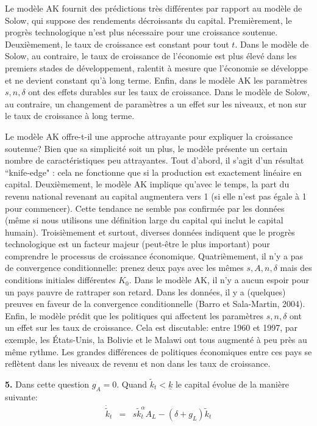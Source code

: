 \documentclass[11pt,a4paper]{article}
\begin{document}
Le modèle AK fournit des prédictions très différentes par rapport au modèle de  Solow, qui suppose des rendements décroissants du capital. Premièrement, le progrès technologique n'est plus nécessaire pour une croissance soutenue. Deuxièmement, le taux de croissance est constant pour tout $t$. Dans le modèle de Solow, au contraire, le taux de croissance de l'économie est plus élevé dans les premiers stades de développement, ralentit à mesure que l'économie se développe et ne devient constant qu'à long terme. Enfin, dans le modèle AK les 
paramètres $s,n,\delta$ ont des effets  durables sur les taux de croissance. Dans le modèle de Solow, au contraire, un changement de paramètres a un effet sur les niveaux, et non sur le taux de croissance à long terme.

Le modèle AK offre-t-il une approche attrayante pour expliquer la croissance soutenue? Bien que sa simplicité soit un plus, le modèle présente un certain nombre de caractéristiques peu attrayantes. Tout d'abord, il s'agit d'un résultat ``knife-edge" : cela ne fonctionne que si la production est exactement linéaire en capital. Deuxièmement, le modèle AK implique qu'avec le temps, la part du revenu national revenant au capital augmentera vers 1 (si elle n'est pas égale à 1 pour commencer). Cette tendance ne semble pas confirmée par les données (même si nous utilisons une définition large du capital qui inclut le capital humain). Troisièmement et surtout, diverses données indiquent que le progrès technologique est un facteur majeur (peut-être le plus important) pour comprendre le processus de croissance économique. Quatrièmement, il n'y a pas de convergence conditionnelle: prenez deux pays avec les mêmes $s,A,n,\delta$ mais des conditions initiales différentes $K_0$. Dans le modèle AK, il n'y a aucun espoir pour un pays pauvre de rattraper son retard. Dans les données, il y a (quelques) preuves en faveur de la convergence conditionnelle (Barro et Sala-Martin, 2004). Enfin, le modèle prédit que les politiques qui affectent les paramètres $s,n,\delta$ ont un effet sur les taux de croissance. Cela est discutable: entre 1960 et 1997, par exemple, les États-Unis, la Bolivie et le Malawi ont tous augmenté à peu près au même rythme. Les grandes différences de politiques économiques entre ces pays se reflètent dans les niveaux de revenu et non dans les taux de croissance.

\bigskip

\noindent \textbf{5.} 
Dans cette question $g_A=0.$ Quand $\tilde{k}_t <  \underline{k}$ le capital évolue de la manière suivante:
\begin{eqnarray*}
 \dot{\tilde{k}}_t&=&s \tilde{k}_t^{\alpha }A_{L}-(\delta+g_L)\tilde{k}_t
\end{eqnarray*}
\end{document}
